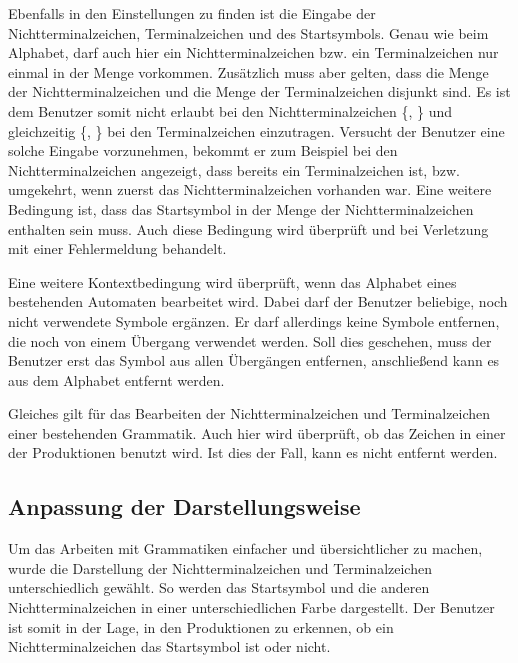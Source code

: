 Ebenfalls in den Einstellungen zu finden ist die Eingabe der
Nichtterminalzeichen, Terminalzeichen und des Startsymbols. Genau wie beim
Alphabet, darf auch hier ein Nichtterminalzeichen bzw. ein Terminalzeichen nur
einmal in der Menge vorkommen. Zusätzlich muss aber gelten, dass die Menge der
Nichtterminalzeichen  und die Menge der Terminalzeichen disjunkt sind. Es
ist dem Benutzer somit nicht erlaubt bei den Nichtterminalzeichen
\{, \} und gleichzeitig
\{, \} bei den Terminalzeichen einzutragen.
Versucht der Benutzer eine solche Eingabe vorzunehmen, bekommt er zum Beispiel
bei den Nichtterminalzeichen angezeigt, dass  bereits ein
Terminalzeichen ist, bzw. umgekehrt, wenn zuerst das Nichtterminalzeichen
vorhanden war. Eine weitere Bedingung ist, dass das Startsymbol in der Menge der
Nichtterminalzeichen enthalten sein muss. Auch diese Bedingung wird überprüft
und bei Verletzung mit einer Fehlermeldung behandelt.\vspace{10pt}

Eine weitere Kontextbedingung wird überprüft, wenn das Alphabet eines
bestehenden Automaten bearbeitet wird. Dabei darf der Benutzer beliebige, 
noch nicht verwendete Symbole ergänzen. Er darf allerdings keine Symbole
entfernen, die noch von einem Übergang verwendet werden. Soll dies geschehen,
muss der Benutzer erst das Symbol aus allen Übergängen entfernen,
anschließend kann es aus dem Alphabet entfernt werden.\vspace{10pt}

Gleiches gilt für das Bearbeiten der Nichtterminalzeichen und Terminalzeichen
einer bestehenden Grammatik. Auch hier wird überprüft, ob das Zeichen in einer
der Produktionen benutzt wird. Ist dies der Fall, kann es nicht entfernt
werden.\vspace{10pt}


\subsection{Anpassung der Darstellungsweise}\label{ParserAdaption}

Um das Arbeiten mit Grammatiken einfacher und übersichtlicher zu machen, wurde
die Darstellung der Nichtterminalzeichen und Terminalzeichen unterschiedlich
gewählt. So werden das Startsymbol und die anderen Nichtterminalzeichen in einer
unterschiedlichen Farbe dargestellt. Der Benutzer ist somit in der Lage, in den
Produktionen zu erkennen, ob ein Nichtterminalzeichen das Startsymbol ist oder
nicht.\vspace{10pt}


